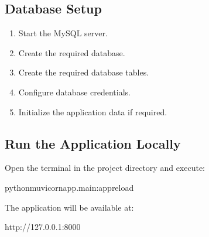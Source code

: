 \documentclass[letterpaper,10pt,english]{sphinxmanual}
\begin{document}
\subsection{Database Setup}
\label{\detokenize{deployment:database-setup}}\begin{enumerate}
%
\item {} 
\sphinxAtStartPar
Start the MySQL server.

\item {} 
\sphinxAtStartPar
Create the required database.

\item {} 
\sphinxAtStartPar
Create the required database tables.

\item {} 
\sphinxAtStartPar
Configure database credentials.

\item {} 
\sphinxAtStartPar
Initialize the application data if required.

\end{enumerate}


\subsection{Run the Application Locally}
\label{\detokenize{deployment:run-the-application-locally}}
\sphinxAtStartPar
Open the terminal in the project directory and execute:

\begin{sphinxVerbatim}[commandchars=\\\{\}]
python\PYGZhy{}muvicornapp.main:app\PYGZhy{}\PYGZhy{}reload
\end{sphinxVerbatim}

\sphinxAtStartPar
The application will be available at:

\begin{sphinxVerbatim}[commandchars=\\\{\}]
http://127.0.0.1:8000
\end{sphinxVerbatim}
\end{document}

